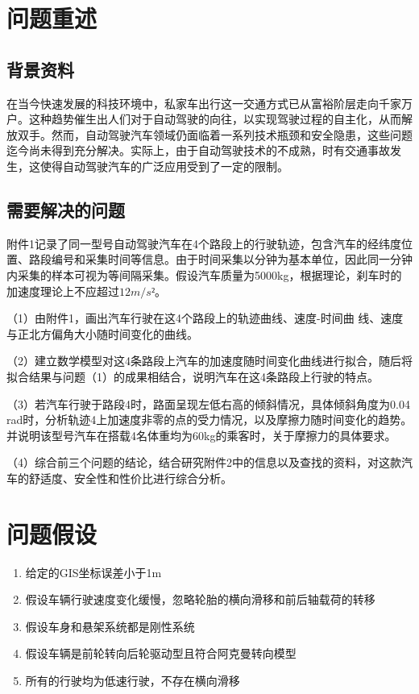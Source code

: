 \documentclass[withoutpreface,bwprint]{cumcmthesis} %
\begin{document}
\section{问题重述}

\subsection{背景资料}
在当今快速发展的科技环境中，私家车出行这一交通方式已从富裕阶层走向千家万户。这种趋势催生出人们对于自动驾驶的向往，以实现驾驶过程的自主化，从而解放双手。然而，自动驾驶汽车领域仍面临着一系列技术瓶颈和安全隐患，这些问题迄今尚未得到充分解决。实际上，由于自动驾驶技术的不成熟，时有交通事故发生，这使得自动驾驶汽车的广泛应用受到了一定的限制。

\subsection{需要解决的问题}
附件1记录了同一型号自动驾驶汽车在4个路段上的行驶轨迹，包含汽车的经纬度位置、路段编号和采集时间等信息。由于时间采集以分钟为基本单位，因此同一分钟内采集的样本可视为等间隔采集。假设汽车质量为5000kg，根据理论，刹车时的加速度理论上不应超过$12m/s²$。

（1）由附件1，画出汽车行驶在这4个路段上的轨迹曲线、速度-时间曲
线、速度与正北方偏角大小随时间变化的曲线。

（2）建立数学模型对这4条路段上汽车的加速度随时间变化曲线进行拟合，随后将拟合结果与问题（1）的成果相结合，说明汽车在这4条路段上行驶的特点。

（3）若汽车行驶于路段4时，路面呈现左低右高的倾斜情况，具体倾斜角度为0.04 rad时，分析轨迹4上加速度非零的点的受力情况，以及摩擦力随时间变化的趋势。并说明该型号汽车在搭载4名体重均为60kg的乘客时，关于摩擦力的具体要求。

（4）综合前三个问题的结论，结合研究附件2中的信息以及查找的资料，对这款汽车的舒适度、安全性和性价比进行综合分析。

\section{问题假设}
\begin{enumerate}
    \item 给定的GIS坐标误差小于1m 
    \item 假设车辆行驶速度变化缓慢，忽略轮胎的横向滑移和前后轴载荷的转移
    \item  假设车身和悬架系统都是刚性系统
    \item 假设车辆是前轮转向后轮驱动型且符合阿克曼转向模型
    \item 所有的行驶均为低速行驶，不存在横向滑移
\end{enumerate}
\end{document}
